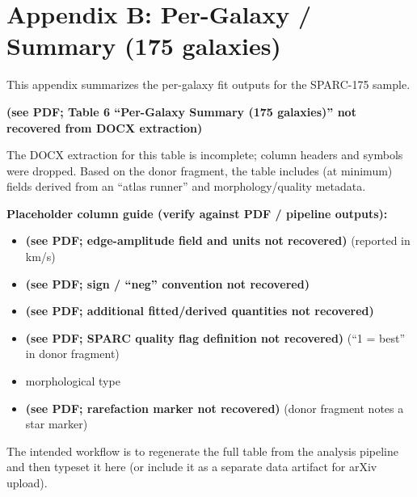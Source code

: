 \section{Appendix B: Per-Galaxy  /  Summary (175 galaxies)}

This appendix summarizes the per-galaxy fit outputs for the SPARC-175 sample.

\textbf{(see PDF; Table 6 ``Per-Galaxy Summary (175 galaxies)'' not recovered from DOCX extraction)}

\noindent The DOCX extraction for this table is incomplete; column headers and symbols were dropped. Based on the donor fragment, the table includes (at minimum) fields derived from an ``atlas runner'' and morphology/quality metadata.

\noindent \textbf{Placeholder column guide (verify against PDF / pipeline outputs):}
\begin{itemize}
	\item \textbf{(see PDF; edge-amplitude field and units not recovered)} (reported in km/s)
	\item \textbf{(see PDF; sign / ``neg'' convention not recovered)}
	\item \textbf{(see PDF; additional fitted/derived quantities not recovered)}
	\item \textbf{(see PDF; SPARC quality flag definition not recovered)} (``1 = best'' in donor fragment)
	\item morphological type
	\item \textbf{(see PDF; rarefaction marker not recovered)} (donor fragment notes a star marker)
\end{itemize}

\noindent The intended workflow is to regenerate the full table from the analysis pipeline and then typeset it here (or include it as a separate data artifact for arXiv upload).
